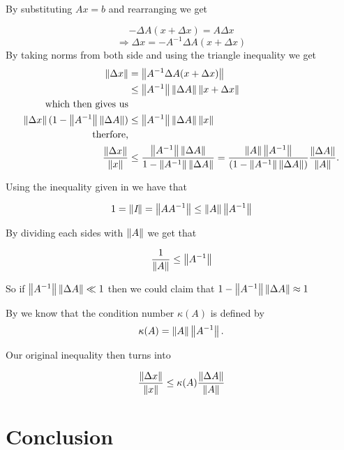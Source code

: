 \documentclass[12pt,reqno,twoside,titlepage]{article}
\theoremstyle{definition}
\begin{document}
By substituting $Ax=b$ and rearranging  we get

$$-\Delta A(x+\Delta x)=A\Delta x$$
$$\Rightarrow \Delta x=-A^{-1}\Delta A(x+\Delta x)$$
By taking norms from both side and using the triangle inequality we get
\begin{align*}
\left\lVert\Delta x\right\rVert&=\left\lVert A^{-1}\Delta A(x+\Delta x)\right\rVert
\\ &\leq \left\lVert A^{-1}\right\rVert\left\lVert\Delta A\right\rVert \left\lVert x+ \Delta x\right\rVert
\\\text{which then gives us}\\
\left\lVert\Delta x\right\rVert(1-\left\lVert A^{-1}\right\rVert\left\lVert\Delta A\right\rVert)&\leq\left\lVert A^{-1}\right\rVert\left\lVert\Delta A\right\rVert\left\lVert x\right\rVert
\\\text{therfore,}\\
\frac{\left\lVert\Delta x\right\rVert}{\left\lVert x\right\rVert} &\leq\frac{\left\lVert A^{-1}\right\rVert\left\lVert\Delta A\right\rVert}{1-\left\lVert A^{-1}\right\rVert\left\lVert\Delta A\right\rVert}
=\frac{\left\lVert A\right\rVert\left\lVert A^{-1}\right\rVert}{(1-\left\lVert A^{-1}\right\rVert\left\lVert\Delta A\right\rVert)}\frac{\left\lVert\Delta A\right\rVert}{\left\lVert A\right\rVert}.
\end{align*}

Using the inequality given in \cite{slq} we have that 

$$1=\left\lVert\textit{I}\right\rVert=\left\lVert AA^{-1}\right\rVert\leq \left\lVert A\right\rVert\left\lVert A^{-1}\right\rVert$$

By dividing each sides with $\left\lVert A\right\rVert$ we get that

$$\frac{1}{\left\lVert A\right\rVert}\leq \left\lVert A^{-1}\right\rVert$$

So if $\left\lVert A^{-1}\right\rVert\left\lVert\Delta A\right\rVert\ll 1$ then we could claim that $1-\left\lVert A^{-1}\right\rVert\left\lVert\Delta A\right\rVert\approx 1$


By\cite{golub2012matrix} we know that the condition number $\kappa (A)$ is defined by
$$\kappa (A)=\left\lVert A\right\rVert\left\lVert A^{-1}\right\rVert.$$

Our original inequality then turns into

$$\frac{\left\lVert\Delta x\right\rVert}{\left\lVert x\right\rVert}\leq\kappa (A)\frac{\left\lVert\Delta A\right\rVert}{\left\lVert A\right\rVert}$$

\section{Conclusion}


\end{document}
